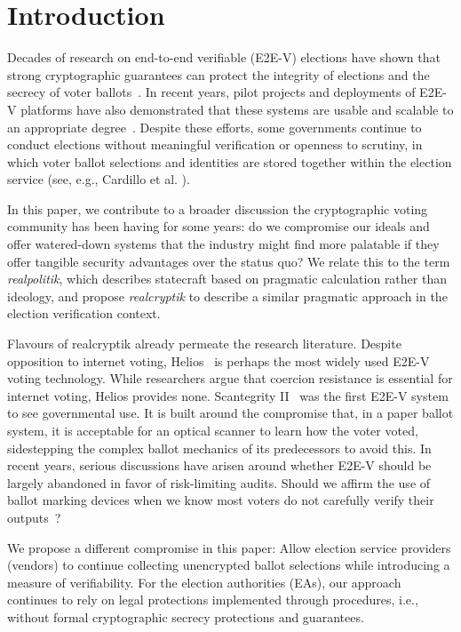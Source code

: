 \section{Introduction}

Decades of research on end-to-end verifiable (E2E-V) elections have shown that strong cryptographic guarantees can protect the integrity of elections and the secrecy of voter ballots~\cite{HR16}. 
In recent years, pilot projects and deployments of E2E-V platforms have also demonstrated that these systems are usable and scalable to an appropriate degree~\cite{AMPQ09,CCC+10,BBB+13,CRST15}. 
Despite these efforts, some governments continue to conduct elections without meaningful verification or openness to scrutiny, in which voter ballot selections and identities are stored together within the election service (see, e.g., Cardillo et al. \cite{cae19}).

In this paper, we contribute to a broader discussion the cryptographic voting community has been having for some years: do we compromise our ideals and offer watered-down systems that the industry might find more palatable if they offer tangible security advantages over the status quo? 
We relate this to the term \emph{realpolitik}, which describes statecraft based on pragmatic calculation rather than ideology, and propose \textit{realcryptik} to describe a similar pragmatic approach in the election verification context.

Flavours of realcryptik already permeate the research literature. 
Despite opposition to internet voting, Helios~\cite{Adi08} is perhaps the most widely used E2E-V voting technology. 
While researchers argue that coercion resistance is essential for internet voting, Helios provides none. 
Scantegrity II~\cite{CCC+08} was the first E2E-V system to see governmental use. 
It is built around the compromise that, in a paper ballot system, it is acceptable for an optical scanner to learn how the voter voted, sidestepping the complex ballot mechanics of its predecessors to avoid this. 
In recent years, serious discussions have arisen around whether E2E-V should be largely abandoned in favor of risk-limiting audits. 
Should we affirm the use of ballot marking devices when we know most voters do not carefully verify their outputs~\cite{BMM+20}?

We propose a different compromise in this paper: Allow election service providers (vendors) to continue collecting unencrypted ballot selections while introducing a measure of verifiability. 
For the election authorities (EAs), our approach continues to rely on legal protections implemented through procedures, i.e., without formal cryptographic secrecy protections and guarantees.

